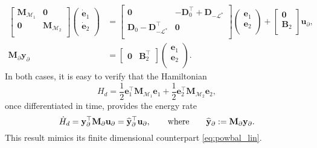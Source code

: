 \begin{equation}\label{eq:pHlinsys_findim_J2}
\begin{aligned}
\begin{bmatrix}
\mathbf{M}_{\mathcal{M}_1} & \mathbf{0} \\
\mathbf{0} & \mathbf{M}_{\mathcal{M}_2} \\
\end{bmatrix}
\begin{pmatrix}
\dot{\mathbf{e}}_{1} \\
\dot{\mathbf{e}}_{2} \\
\end{pmatrix}
&= \begin{bmatrix}
\mathbf{0} & -\mathbf{D}_{0}^\top + \mathbf{D}_{-\mathcal{L}^*} \\
\mathbf{D}_{0} - \mathbf{D}_{-\mathcal{L}^*}^\top & \mathbf{0} \\
\end{bmatrix} 
\begin{pmatrix}
\mathbf{e}_{1} \\
\mathbf{e}_{2} \\
\end{pmatrix} + 
\begin{bmatrix}
\mathbf{0}\\
\mathbf{B}_2\\
\end{bmatrix}
\mathbf{u}_\partial, \\
\mathbf{M}_\partial {\mathbf{y}_\partial} &= 
\begin{bmatrix}
\mathbf{0} & \mathbf{B}_2^\top 
\end{bmatrix}\begin{pmatrix}
\mathbf{e}_{1} \\
\mathbf{e}_{2} \\
\end{pmatrix}.
\end{aligned}
\end{equation}
In both cases, it is easy to verify that the Hamiltonian
\begin{equation}
H_d = \frac{1}{2} {\mathbf{e}}_1^\top \mathbf{M}_{\mathcal{M}_1} {\mathbf{e}}_1 + \frac{1}{2} {\mathbf{e}}_2^\top \mathbf{M}_{\mathcal{M}_2} {\mathbf{e}}_2,
\end{equation}
once differentiated in time, provides the energy rate
\begin{equation}
\dot{H}_d = \mathbf{y}_\partial^\top \mathbf{M}_\partial \mathbf{u}_\partial = \widehat{\mathbf{y}}_\partial^\top \mathbf{u}_\partial, \qquad \text{where} \qquad \widehat{\mathbf{y}}_\partial:=\mathbf{M}_\partial \mathbf{y}_\partial.
\end{equation}
This result mimics its finite dimensional counterpart \eqref{eq:powbal_lin}.
